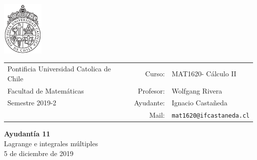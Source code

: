 \documentclass[12pt]{article}
\makeatletter
\newcommand{\ayudantia}{{\sc Ayudantía 11}}
\newcommand{\tituloayu}{Lagrange e integrales múltiples}
\newcommand{\fecha}{5 de diciembre de 2019}
\newcommand{\sigla}{MAT1620}
\newcommand{\nombre}{Cálculo II}
\newcommand{\profesor}{Wolfgang Rivera}
\newcommand{\ano}{2019}
\newcommand{\semestre}{2}
\newcommand{\mail}{mat1620@ifcastaneda.cl}
\makeatother
\begin{document}
\thispagestyle{empty}

\begin{minipage}{2cm}
	\includegraphics[width=2cm]{../../../../img/logo.pdf}
	\vspace{0.5cm}
\end{minipage}
\begin{minipage}{\linewidth}
	\begin{tabular}{lrl}
		{\scriptsize\sc Pontificia Universidad Catolica de Chile} & \hspace*{0.7in}Curso: &
		\sigla  - \nombre\\
		{\sc Facultad de Matemáticas}&
		Profesor: & \profesor \\
		{\sc Semestre \ano-\semestre} & Ayudante: & {Ignacio Castañeda}\\
		& {Mail:} & \texttt{\mail}
	\end{tabular}
\end{minipage}

\vspace{-10mm}
\begin{center}
	{\LARGE\bf \ayudantia}\\
	\vspace{0.1cm}
	{\tituloayu}\\
	\vspace{0.1cm}
	\fecha\\
	\vspace{0.4cm}
\end{center}
\end{document}
